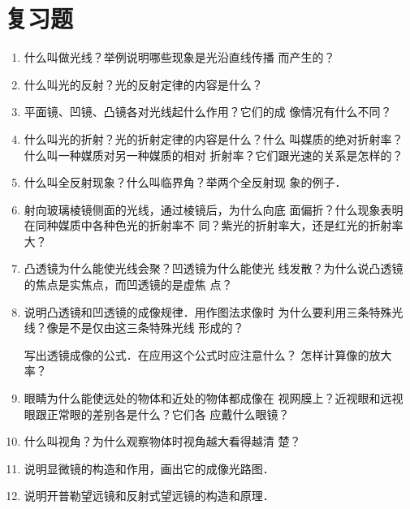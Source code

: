 \section*{复习题}
\begin{enumerate}
\item 什么叫做光线？举例说明哪些现象是光沿直线传播
而产生的？
\item 什么叫光的反射？光的反射定律的内容是什么？
\item 平面镜、凹镜、凸镜各对光线起什么作用？它们的成
像情况有什么不同？
\item 什么叫光的折射？光的折射定律的内容是什么？什么
叫媒质的绝对折射率？什么叫一种媒质对另一种媒质的相对
折射率？它们跟光速的关系是怎样的？
\item 什么叫全反射现象？什么叫临界角？举两个全反射现
象的例子．
\item 射向玻璃棱镜侧面的光线，通过棱镜后，为什么向底
面偏折？什么现象表明在同种媒质中各种色光的折射率不
同？紫光的折射率大，还是红光的折射率大？
\item 凸透镜为什么能使光线会聚？凹透镜为什么能使光
线发散？为什么说凸透镜的焦点是实焦点，而凹透镜的是虚焦
点？
\item 说明凸透镜和凹透镜的成像规律．用作图法求像时
为什么要利用三条特殊光线？像是不是仅由这三条特殊光线
形成的？

写出透镜成像的公式．在应用这个公式时应注意什么？
怎样计算像的放大率？
\item 眼睛为什么能使远处的物体和近处的物体都成像在
视网膜上？近视眼和远视眼跟正常眼的差别各是什么？它们各
应戴什么眼镜？
\item 什么叫视角？为什么观察物体时视角越大看得越清
楚？
\item 说明显微镜的构造和作用，画出它的成像光路图．
\item 说明开普勒望远镜和反射式望远镜的构造和原理．

\end{enumerate}

